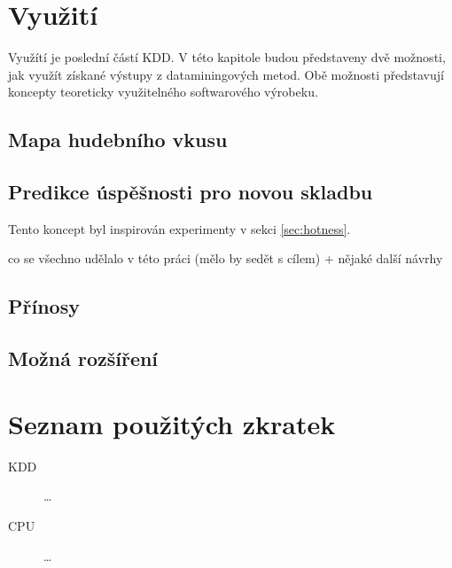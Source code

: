 \documentclass[thesis=M,czech]{FITthesis}[2012/06/26]
\begin{document}
\chapter{Využití}

Využítí je poslední částí KDD. V této kapitole budou představeny dvě možnosti, jak využít získané výstupy z dataminingových metod. Obě možnosti představují koncepty teoreticky využitelného softwarového výrobeku.


\section{Mapa hudebního vkusu}


\section{Predikce úspěšnosti pro novou skladbu}
Tento koncept byl inspirován experimenty v sekci \ref{sec:hotness}. 



\begin{conclusion}
	co se všechno udělalo v této práci (mělo by sedět s cílem)
	+ nějaké další návrhy
	
	\section{Přínosy}
	
	\section{Možná rozšíření}
\end{conclusion}




\appendix

\chapter{Seznam použitých zkratek}
\begin{description}
	\item[KDD] \dots
	\item[CPU] \dots
\end{description}
\end{document}

